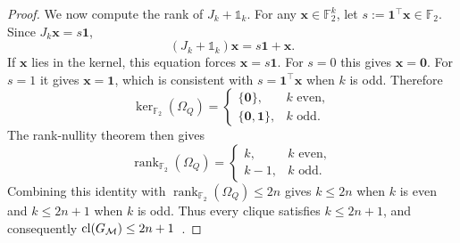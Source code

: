 \documentclass[10pt,aps,pra,twocolumn,floatfix,nofootinbib,superscriptaddress,longbibliography]{revtex4-2}
\newcommand{\Ftwo}{\mathbb F_2}
\newcommand{\Mcal}{\mathcal M}
\providecommand{\mathbm}[1]{\bm{#1}}
\begin{document}
\begin{bibunit}[apsrev4-2]
\begin{proof}
			We now compute the rank of $J_k+\mathbb{1}_k$. For any $\mathbm{x}\in\Ftwo^k$, let $s:=\mathbm{1}^\top\mathbm{x}\in\Ftwo$. Since $J_k\mathbm{x}=s\mathbm{1}$,
			\begin{equation}
				\displaystyle
				(J_k+\mathbb{1}_k)\mathbm{x}
				=s\mathbm{1}+\mathbm{x}.
			\end{equation}
			If $\mathbm{x}$ lies in the kernel, this equation forces $\mathbm{x}=s\mathbm{1}$. For $s=0$ this gives $\mathbm{x}=\mathbm{0}$. For $s=1$ it gives $\mathbm{x}=\mathbm{1}$, which is consistent with $s=\mathbm{1}^\top\mathbm{x}$ when $k$ is odd. Therefore
			\begin{equation}
				\displaystyle
				\ker_{\Ftwo}(\Omega_Q)
				=
				\begin{cases}
					\{\mathbm{0}\},&k\text{ even},\\
					\{\mathbm{0}, \mathbm{1}\},&k\text{ odd}.
				\end{cases}
			\end{equation}
			The rank-nullity theorem then gives
			\begin{equation}
				\displaystyle
				\operatorname{rank}_{\Ftwo}(\Omega_Q)
				=
				\begin{cases}
					k,&k\text{ even},\\
					k-1,&k\text{ odd}.
				\end{cases}
			\end{equation}
			Combining this identity with $\operatorname{rank}_{\Ftwo}(\Omega_Q)\le2n$ gives $k\le2n$ when $k$ is even and $k\le2n+1$ when $k$ is odd. Thus every clique satisfies $k\le2n+1$, and consequently $\clnum(G_\Mcal)\le2n+1$~\cite{sarkar2021sets}.
			

\end{proof}
\end{bibunit}
\end{document}
